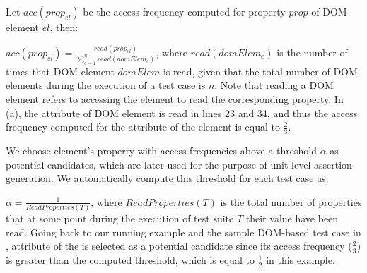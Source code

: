 Let $acc(prop_{el})$ be the access frequency computed for property $prop$ of DOM element $el$, then:
 
$acc(prop_{el})=\frac{read(prop_{el})}{\sum _{e=1}^{n} read(domElem_e)}$, where $read(domElem_{e})$ is the number of times that DOM element $domElem$ is read, given that the total number of DOM elements during the execution of a test case is $n$.
Note that reading a DOM element refers to accessing the element to read the corresponding property. In  (a), the  attribute of DOM element  is read in lines 23 and 34, and thus the access frequency
computed for the  attribute of the element is equal to $\frac{2}{3}$.

We choose element's property with access frequencies above a threshold $\alpha$ as potential candidates, which are later used for the purpose of unit-level assertion generation. We automatically compute this threshold for each test case as: 

$\alpha=\frac{1}{ReadProperties(T)}$, where $ReadProperties(T)$ is the total number of properties that at some point during the execution of test suite $T$ their value have been read.
Going back to our running example and the sample DOM-based test case in ,  attribute of the  is selected as a potential candidate since its access frequency ($\frac{2}{3}$) is greater than the computed threshold, which is equal to $\frac{1}{2}$ in this example.        
